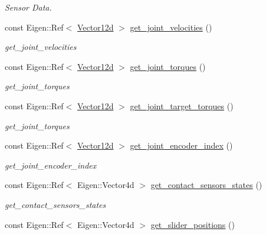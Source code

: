 \begin{DoxyCompactItemize}
\begin{DoxyCompactList}\small\item\em Sensor Data. \end{DoxyCompactList}\item 
const Eigen\+::\+Ref$<$ \hyperlink{common__header_8hpp_a80313eb420184518596e745eecf4b494}{Vector12d} $>$ \hyperlink{classblmc__robots_1_1Solo12_aa0a6eb846038b644b425c1efd4c8a81f}{get\+\_\+joint\+\_\+velocities} ()
\begin{DoxyCompactList}\small\item\em get\+\_\+joint\+\_\+velocities \end{DoxyCompactList}\item 
const Eigen\+::\+Ref$<$ \hyperlink{common__header_8hpp_a80313eb420184518596e745eecf4b494}{Vector12d} $>$ \hyperlink{classblmc__robots_1_1Solo12_acfc399c1070c44d4ae98a1d806dca783}{get\+\_\+joint\+\_\+torques} ()
\begin{DoxyCompactList}\small\item\em get\+\_\+joint\+\_\+torques \end{DoxyCompactList}\item 
const Eigen\+::\+Ref$<$ \hyperlink{common__header_8hpp_a80313eb420184518596e745eecf4b494}{Vector12d} $>$ \hyperlink{classblmc__robots_1_1Solo12_ab8a6277bddcd64ec33eb8720d9478f7d}{get\+\_\+joint\+\_\+target\+\_\+torques} ()
\begin{DoxyCompactList}\small\item\em get\+\_\+joint\+\_\+torques \end{DoxyCompactList}\item 
const Eigen\+::\+Ref$<$ \hyperlink{common__header_8hpp_a80313eb420184518596e745eecf4b494}{Vector12d} $>$ \hyperlink{classblmc__robots_1_1Solo12_a7569444864f60d87ba9d9d0b5cc01afe}{get\+\_\+joint\+\_\+encoder\+\_\+index} ()
\begin{DoxyCompactList}\small\item\em get\+\_\+joint\+\_\+encoder\+\_\+index \end{DoxyCompactList}\item 
const Eigen\+::\+Ref$<$ Eigen\+::\+Vector4d $>$ \hyperlink{classblmc__robots_1_1Solo12_a79d74e1bbae286d8d79a94e328d3ad00}{get\+\_\+contact\+\_\+sensors\+\_\+states} ()
\begin{DoxyCompactList}\small\item\em get\+\_\+contact\+\_\+sensors\+\_\+states \end{DoxyCompactList}\item 
const Eigen\+::\+Ref$<$ Eigen\+::\+Vector4d $>$ \hyperlink{classblmc__robots_1_1Solo12_a2881a38d56aece096ca2c0ca42f2d56c}{get\+\_\+slider\+\_\+positions} ()

\end{DoxyCompactItemize}
